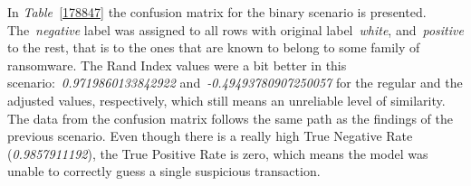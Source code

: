 \documentclass[10pt]{article}
\begin{document}
In \emph{Table~}{\ref{178847}} the confusion matrix for
the binary scenario is presented. The~\emph{negative} label was assigned
to all rows with original label~\emph{white}, and~\emph{positive} to the
rest, that is to the ones that are known to belong to some family of
ransomware. The Rand Index values were a bit better in this
scenario:~\emph{0.9719860133842922} and~\emph{-0.49493780907250057} for
the regular and the adjusted values, respectively, which still means an
unreliable level of similarity. The data from the confusion matrix
follows the same path as the findings of the previous scenario. Even
though there is a really high True Negative Rate~ (\emph{0.9857911192}),
the True Positive Rate is zero, which means the model was unable to
correctly guess a single suspicious transaction.

\par\null{}
\end{document}
